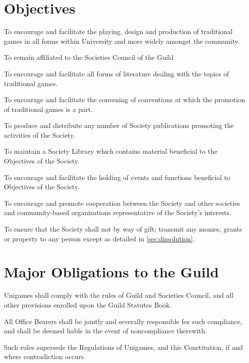 \documentclass[a4paper]{article}
\begin{document}
\section{Objectives} \label{sec:objectives}
\begin{myEnumerate}
    \item To encourage and facilitate the playing, design and production of traditional games in all forms within University and more widely amongst the community.
    \item To remain affiliated to the Societies Council of the Guild
    \item To encourage and facilitate all forms of literature dealing with the topics of traditional games.
    \item To encourage and facilitate the convening of conventions at which the promotion of traditional games is a part.
    \item To produce and distribute any number of Society publications promoting the activities of the Society.
    \item To maintain a Society Library which contains material beneficial to the Objectives of the Society.
    \item To encourage and facilitate the holding of events and functions beneficial to Objectives of the Society.
    \item To encourage and promote cooperation between the Society and other societies and community-based organizations representative of the Society's interests.
    \item To ensure that the Society shall not by way of gift; transmit any monies, grants or property to any person except as detailed in \cref{sec:dissolution}.
\end{myEnumerate}


\section{Major Obligations to the Guild} \label{sec:obligations}
\begin{myEnumerate}
    \item Unigames shall comply with the rules of Guild and Societies Council, and all other provisions enrolled upon the Guild Statutes Book.
          \begin{myEnumerate}
              \item All Office Bearers shall be jointly and severally responsible for such compliance, and shall be deemed liable in the event of noncompliance therewith.
          \end{myEnumerate}
    \item Such rules supersede the Regulations of Unigames, and this Constitution, if and where contradiction occurs.
\end{myEnumerate}
\end{document}
